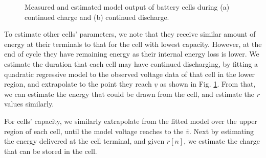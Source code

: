\documentclass[10pt,twocolumn]{IEEEtran}
\begin{document}
\begin{figure}[t]
\centering
\vspace{-0.2cm}
{} \vspace{-0.1cm}
\caption{Measured and estimated model output of  battery cells during  (a) continued charge  and (b) continued discharge.}
\vspace{-0.3cm}
\label{fig:voltagestimate}
\end{figure}



To estimate other cells' parameters, we note that they receive similar amount of energy at their terminals to that for the cell with lowest capacity.
However, at the end of cycle they have remaining energy as their internal energy loss is lower.
We estimate the duration that each cell may have continued discharging, by fitting a quadratic regressive model to the observed voltage data of that cell in the lower region, and extrapolate to the point they reach $\underline{v}$ as shown in Fig. \ref{fig:voltagestimate}.
From that, we can estimate the energy that could be drawn from the cell, and estimate the $r$ values similarly.

For cells' capacity, we similarly extrapolate from the fitted model over the upper region  of each cell, until the model voltage reaches to the $\overline{v}$.
Next by estimating the energy delivered at the cell terminal, and given $r[n]$, we estimate the charge that can be stored in the cell.
\end{document}
